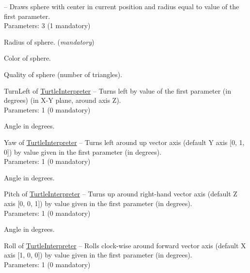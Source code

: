 \begin{description*}
			-- Draws sphere with center in current position and radius equal to value of the first parameter.
		\\ Parameters: 3  (1 mandatory) 
			\begin{enumerate*}
				\item
Radius of sphere. (\textit{mandatory}) 				\item
            Color of sphere.				\item
            Quality of sphere (number of triangles).			\end{enumerate*}
		\item[TurnLeft] of \hyperref[Malsys.Processing.Components.Interpreters.TurtleInterpreter]{TurtleInterpreter}
			-- Turns left by value of the first parameter (in degrees) (in X-Y plane, around axis Z).
		\\ Parameters: 1  (0 mandatory) 
			\begin{enumerate*}
				\item
Angle in degrees.			\end{enumerate*}
		\item[Yaw] of \hyperref[Malsys.Processing.Components.Interpreters.TurtleInterpreter]{TurtleInterpreter}
			-- Turns left around up vector axis (default Y axis [0, 1, 0]) by value given in the first parameter (in degrees).
		\\ Parameters: 1  (0 mandatory) 
			\begin{enumerate*}
				\item
Angle in degrees.			\end{enumerate*}
		\item[Pitch] of \hyperref[Malsys.Processing.Components.Interpreters.TurtleInterpreter]{TurtleInterpreter}
			-- Turns up around right-hand vector axis (default Z axis [0, 0, 1]) by value given in the first parameter (in degrees).
		\\ Parameters: 1  (0 mandatory) 
			\begin{enumerate*}
				\item
Angle in degrees.			\end{enumerate*}
		\item[Roll] of \hyperref[Malsys.Processing.Components.Interpreters.TurtleInterpreter]{TurtleInterpreter}
			-- Rolls clock-wise around forward vector axis (default X axis [1, 0, 0]) by value given in the first parameter (in degrees).
		\\ Parameters: 1  (0 mandatory) 
			\begin{enumerate*}
				\item

\end{enumerate*}
\end{description*}
